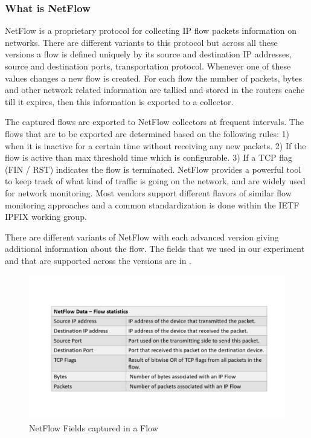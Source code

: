 \subsubsection{What is NetFlow}
NetFlow is a proprietary protocol for collecting IP flow packets information on networks. There are different variants to this protocol but across all these versions a flow is defined uniquely by its source and destination IP addresses, source and destination ports, transportation protocol. Whenever one of these values changes a new flow is created. For each flow the number of packets, bytes and other network related information are tallied and stored in the routers cache till it expires, then this information is exported to a collector. 

The captured flows are exported to NetFlow collectors at frequent intervals. The flows that are to be exported are determined based on the following rules: 1) when it is inactive for a certain time without receiving any new packets. 2) If the flow is active than max threshold time which is configurable. 3) If a TCP flag (FIN / RST) indicates the flow is terminated. NetFlow provides a powerful tool to keep track of what kind of traffic is going on the network, and are widely used for network monitoring. Most vendors support different flavors of similar flow monitoring approaches and a common standardization is done within the IETF IPFIX working group.

There are different variants of NetFlow with each advanced version giving additional information about the flow. The fields that we used in our experiment and that are supported across the versions are in .

\begin{figure}[t]
	\centerline{
	\includegraphics[trim=2cm 2cm 2cm 2cm, scale = 0.55]{netflow.pdf}}
	\caption{NetFlow Fields captured in a Flow }
\end{figure}

